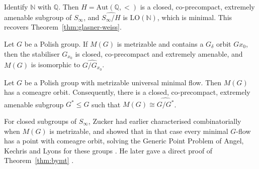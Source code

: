 \begin{example}\label{ex:lo-coprecompact}
Identify $\mathbb{N}$ with $\mathbb{Q}$. Then $H=\mathrm{Aut}(\mathbb{Q},<)$ is
a closed, co-precompact, extremely amenable subgroup of $S_\infty$, and
$\widehat{S_\infty/H}$ is $\mathrm{LO}(\mathbb{N})$, which is minimal. This
recovers Theorem~\ref{thm:glasner-weiss}.
\end{example}

\begin{theorem}\label{thm:mnt}
Let $G$ be a Polish group. If $M(G)$ is metrizable and contains a $G_\delta$
orbit $Gx_0$, then the stabiliser $G_{x_0}$ is closed, co-precompact and
extremely amenable, and $M(G)$ is isomorphic to $\widehat{G/G_{x_0}}$.
\end{theorem}

\begin{theorem}\label{thm:bymt}
Let $G$ be a Polish group with metrizable universal minimal flow. Then $M(G)$
has a comeagre orbit. Consequently, there is a closed, co-precompact,
extremely amenable subgroup $G^*\leq G$ such that
$M(G)\cong\widehat{G/G^*}$.
\end{theorem}

\begin{remark}[Zucker]\label{rem:zucker}
For closed subgroups of $S_\infty$, Zucker had earlier characterised
combinatorially when $M(G)$ is metrizable, and showed that in that case every
minimal $G$-flow has a point with comeagre orbit, solving the Generic Point
Problem of Angel, Kechris and Lyons for these groups \cite{Zucker2016}. He
later gave a direct proof of Theorem~\ref{thm:bymt} \cite{Zucker2018}.
\end{remark}
